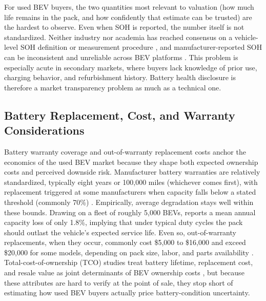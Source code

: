 \documentclass[a4paper,fleqn]{cas-sc}   %
\begin{document}
For used BEV buyers, the two quantities most relevant to valuation (how much life remains in the pack, and how confidently that estimate can be trusted) are the hardest to observe. Even when SOH is reported, the number itself is not standardized. Neither industry nor academia has reached consensus on a vehicle-level SOH definition or measurement procedure \parencite{bilfingerWhyWeNeed2025}, and manufacturer-reported SOH can be inconsistent and unreliable across BEV platforms \parencite{parkBatteryHealthReporting2026}. This problem is especially acute in secondary markets, where buyers lack knowledge of prior use, charging behavior, and refurbishment history. Battery health disclosure is therefore a market transparency problem as much as a technical one.

\subsection{Battery Replacement, Cost, and Warranty Considerations}

Battery warranty coverage and out-of-warranty replacement costs anchor the economics of the used BEV market because they shape both expected ownership costs and perceived downside risk. Manufacturer battery warranties are relatively standardized, typically eight years or 100,000 miles (whichever comes first), with replacement triggered at some manufacturers when capacity falls below a stated threshold (commonly 70\%) \parencite{clarkeCarWarrantyCoverage2024}. Empirically, average degradation stays well within these bounds. Drawing on a fleet of roughly 5,000 BEVs, \textcite{dnistranEVBatteriesCan2024} reports a mean annual capacity loss of only 1.8\%, implying that under typical duty cycles the pack should outlast the vehicle's expected service life. Even so, out-of-warranty replacements, when they occur, commonly cost \$5,000 to \$16,000 and exceed \$20,000 for some models, depending on pack size, labor, and parts availability \parencite{kothariBatteryReplacementCosts2024, wittElectricCarBattery2024}. Total-cost-of-ownership (TCO) studies treat battery lifetime, replacement cost, and resale value as  joint determinants of BEV ownership costs \parencite{hagmanTotalCostOwnership2016, letmatheConsumerorientedTotalCost2017}, but because these attributes are hard to verify at the point of sale, they stop short of estimating how used BEV buyers actually price battery-condition uncertainty.
\end{document}
